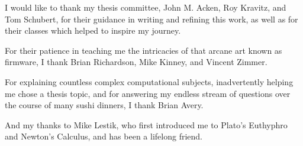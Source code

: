 \noindent I would like to thank my thesis committee, John M. Acken, Roy Kravitz, and Tom Schubert, for their guidance in writing and refining this work, as well as for their classes which helped to inspire my journey.

\vspace{1cm}

\noindent For their patience in teaching me the intricacies of that arcane art known as firmware, I thank Brian Richardson, Mike Kinney, and Vincent Zimmer.

\vspace{1cm}

\noindent For explaining countless complex computational subjects, inadvertently helping me chose a thesis topic, and for answering my endless stream of questions over the course of many sushi dinners, I thank Brian Avery.

\vspace{1cm}

\noindent And my thanks to Mike Lestik, who first introduced me to Plato's Euthyphro and Newton's Calculus, and has been a lifelong friend.
